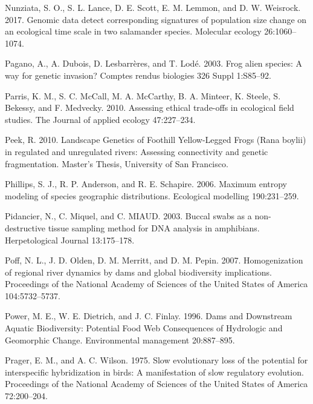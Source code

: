 \documentclass[proquest,12pt,final]{ucthesis-CA2012} %
\begin{document}
\begin{ucmainmatter}
\leavevmode\hypertarget{ref-nunziata_genomic_2017}{}%
Nunziata, S. O., S. L. Lance, D. E. Scott, E. M. Lemmon, and D. W.
Weisrock. 2017. Genomic data detect corresponding signatures of
population size change on an ecological time scale in two salamander
species. Molecular ecology 26:1060--1074.

\leavevmode\hypertarget{ref-pagano_frog_2003}{}%
Pagano, A., A. Dubois, D. Lesbarrères, and T. Lodé. 2003. Frog alien
species: A way for genetic invasion? Comptes rendus biologies 326 Suppl
1:S85--92.

\leavevmode\hypertarget{ref-parris_assessing_2010}{}%
Parris, K. M., S. C. McCall, M. A. McCarthy, B. A. Minteer, K. Steele,
S. Bekessy, and F. Medvecky. 2010. Assessing ethical trade-offs in
ecological field studies. The Journal of applied ecology 47:227--234.

\leavevmode\hypertarget{ref-peek_landscape_2010}{}%
Peek, R. 2010. Landscape Genetics of Foothill Yellow-Legged Frogs (Rana
boylii) in regulated and unregulated rivers: Assessing connectivity and
genetic fragmentation. Master's Thesis, University of San Francisco.

\leavevmode\hypertarget{ref-phillips_maximum_2006}{}%
Phillips, S. J., R. P. Anderson, and R. E. Schapire. 2006. Maximum
entropy modeling of species geographic distributions. Ecological
modelling 190:231--259.

\leavevmode\hypertarget{ref-pidancier_buccal_2003}{}%
Pidancier, N., C. Miquel, and C. MIAUD. 2003. Buccal swabs as a
non-destructive tissue sampling method for DNA analysis in amphibians.
Herpetological Journal 13:175--178.

\leavevmode\hypertarget{ref-poff_homogenization_2007}{}%
Poff, N. L., J. D. Olden, D. M. Merritt, and D. M. Pepin. 2007.
Homogenization of regional river dynamics by dams and global
biodiversity implications. Proceedings of the National Academy of
Sciences of the United States of America 104:5732--5737.

\leavevmode\hypertarget{ref-power_dams_1996}{}%
Power, M. E., W. E. Dietrich, and J. C. Finlay. 1996. Dams and
Downstream Aquatic Biodiversity: Potential Food Web Consequences of
Hydrologic and Geomorphic Change. Environmental management 20:887--895.

\leavevmode\hypertarget{ref-prager_slow_1975}{}%
Prager, E. M., and A. C. Wilson. 1975. Slow evolutionary loss of the
potential for interspecific hybridization in birds: A manifestation of
slow regulatory evolution. Proceedings of the National Academy of
Sciences of the United States of America 72:200--204.


\end{ucmainmatter}
\end{document}
